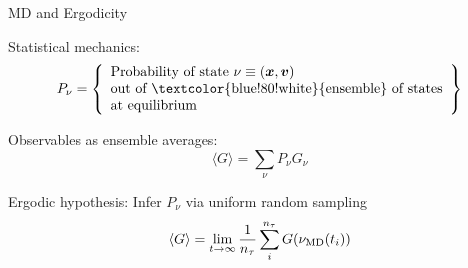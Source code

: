 \begin{frame}[fragile]{MD and Ergodicity}

\textcolor{green!80!black}{Statistical mechanics:}
$$
P_\nu = \left\{\begin{array}{l}
    \mbox{Probability of state $\nu \equiv (\xb,\vb)$}\\
    \mbox{out of \textcolor{blue!80!white}{ensemble} of states}\\
    \mbox{at equilibrium}\\
        \end{array}\right\}
$$

Observables as \textcolor{blue!80!white}{ensemble averages}:
$$
\langle G \rangle = \sum_\nu P_\nu G_\nu
$$

\textcolor{green!80!black}{Ergodic hypothesis: Infer $P_\nu$ via uniform random sampling}
$$
\langle G \rangle = \lim_{t\rightarrow\infty} \frac{1}{n_\tau}\sum_{i}^{n_\tau}G(\nu_{\rm MD}(t_i))
$$ 

\begin{center}
\fbox{\textcolor{red!80!black}{Ergodicity in MD is (usually) unattainable!}}
\end{center}

\end{frame}

